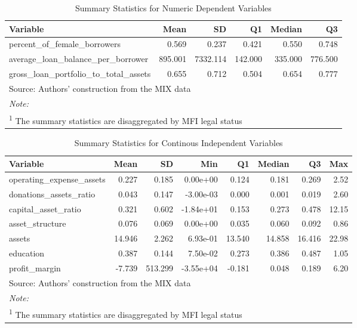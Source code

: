 \documentclass[a4paper, nobind]{templates/ociamthesis}
\begin{document}
\begin{table}

\caption{\label{tab:unnamed-chunk-69}Summary Statistics for Numeric Dependent Variables}
\centering
\fontsize{9}{11}\selectfont
\begin{tabular}[t]{lrrrrr}
\toprule
Variable & Mean & SD & Q1 & Median & Q3\\
\midrule
percent\_of\_female\_borrowers & 0.569 & 0.237 & 0.421 & 0.550 & 0.748\\
average\_loan\_balance\_per\_borrower & 895.001 & 7332.114 & 142.000 & 335.000 & 776.500\\
gross\_loan\_portfolio\_to\_total\_assets & 0.655 & 0.712 & 0.504 & 0.654 & 0.777\\
\bottomrule
\multicolumn{6}{l}{\rule{0pt}{1em}Source: Authors' construction from the MIX data}\\
\multicolumn{6}{l}{\rule{0pt}{1em}\textit{Note: }}\\
\multicolumn{6}{l}{\rule{0pt}{1em}\textsuperscript{1} The summary statistics are disaggregated by MFI legal status}\\
\end{tabular}
\end{table}

\begin{table}

\caption{\label{tab:unnamed-chunk-70}Summary Statistics for Continous Independent Variables}
\centering
\fontsize{10}{12}\selectfont
\begin{tabular}[t]{lrrrrrrr}
\toprule
Variable & Mean & SD & Min & Q1 & Median & Q3 & Max\\
\midrule
operating\_expense\_assets & 0.227 & 0.185 & 0.00e+00 & 0.124 & 0.181 & 0.269 & 2.52\\
donations\_assets\_ratio & 0.043 & 0.147 & -3.00e-03 & 0.000 & 0.001 & 0.019 & 2.60\\
capital\_asset\_ratio & 0.321 & 0.602 & -1.84e+01 & 0.153 & 0.273 & 0.478 & 12.15\\
asset\_structure & 0.076 & 0.069 & 0.00e+00 & 0.035 & 0.060 & 0.092 & 0.86\\
assets & 14.946 & 2.262 & 6.93e-01 & 13.540 & 14.858 & 16.416 & 22.98\\
\addlinespace
education & 0.387 & 0.144 & 7.50e-02 & 0.273 & 0.386 & 0.487 & 1.05\\
profit\_margin & -7.739 & 513.299 & -3.55e+04 & -0.181 & 0.048 & 0.189 & 6.20\\
\bottomrule
\multicolumn{8}{l}{\rule{0pt}{1em}Source: Authors' construction from the MIX data}\\
\multicolumn{8}{l}{\rule{0pt}{1em}\textit{Note: }}\\
\multicolumn{8}{l}{\rule{0pt}{1em}\textsuperscript{1} The summary statistics are disaggregated by MFI legal status}\\
\end{tabular}
\end{table}
\end{document}

